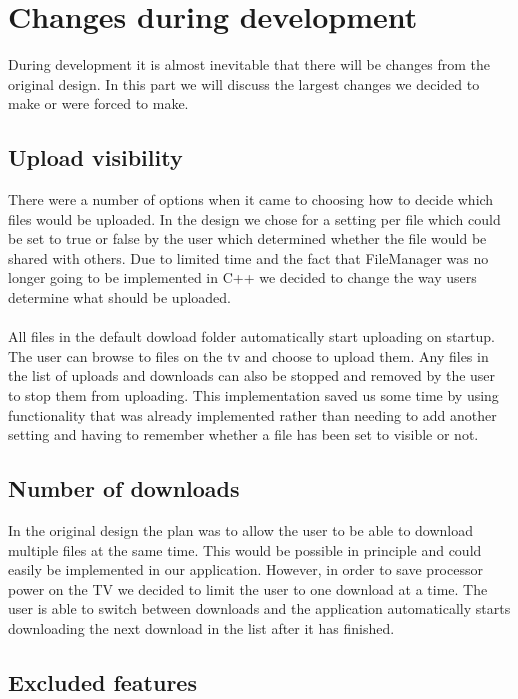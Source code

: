 \section{Changes during development}

During development it is almost inevitable that there will be changes from the original design. In this part we will discuss the largest changes we decided to make or were forced to make.

\subsection{Upload visibility}

There were a number of options when it came to choosing how to decide which files would be uploaded. In the design we chose for a setting per file which could be set to true or false by the user which determined whether the file would be shared with others. Due to limited time and the fact that FileManager was no longer going to be implemented in C++ we decided to change the way users determine what should be uploaded.
\\\\
All files in the default dowload folder automatically start uploading on startup. The user can browse to files on the tv and choose to upload them. Any files in the list of uploads and downloads can also be stopped and removed by the user to stop them from uploading. This implementation saved us some time by using functionality that was already implemented rather than needing to add another setting and having to remember whether a file has been set to visible or not.

\subsection{Number of downloads}

In the original design the plan was to allow the user to be able to download multiple files at the same time. This would be possible in principle and could easily be implemented in our application. However, in order to save processor power on the TV we decided to limit the user to one download at a time. The user is able to switch between downloads and the application automatically starts downloading the next download in the list after it has finished.

\subsection{Excluded features}

